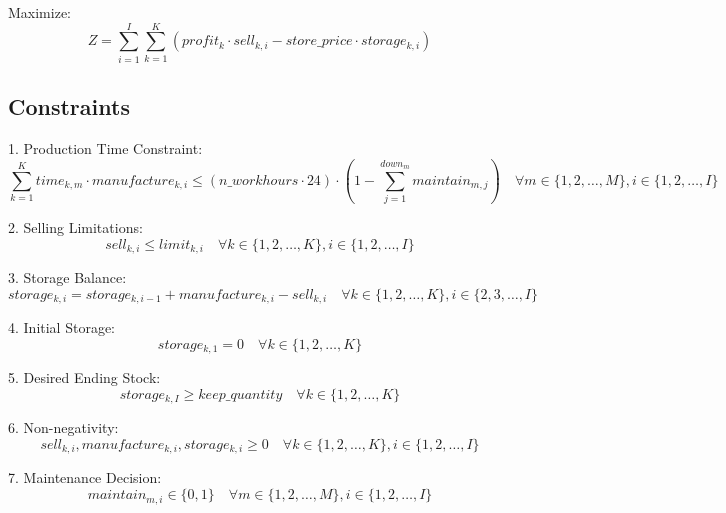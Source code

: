 \documentclass{article}
\begin{document}
Maximize:
\[
Z = \sum_{i=1}^{I} \sum_{k=1}^{K} \left( profit_k \cdot sell_{k,i} - store\_price \cdot storage_{k,i} \right)
\]

\subsection*{Constraints}

1. Production Time Constraint:
\[
\sum_{k=1}^{K} time_{k,m} \cdot manufacture_{k,i} \leq (n\_workhours \cdot 24) \cdot (1 - \sum_{j=1}^{down_m} maintain_{m,j}) \quad \forall m \in \{1, 2, \ldots, M\}, i \in \{1, 2, \ldots, I\}
\]

2. Selling Limitations:
\[
sell_{k,i} \leq limit_{k,i} \quad \forall k \in \{1, 2, \ldots, K\}, i \in \{1, 2, \ldots, I\}
\]

3. Storage Balance:
\[
storage_{k,i} = storage_{k,i-1} + manufacture_{k,i} - sell_{k,i} \quad \forall k \in \{1, 2, \ldots, K\}, i \in \{2, 3, \ldots, I\}
\]

4. Initial Storage:
\[
storage_{k,1} = 0 \quad \forall k \in \{1, 2, \ldots, K\}
\]

5. Desired Ending Stock:
\[
storage_{k,I} \geq keep\_quantity \quad \forall k \in \{1, 2, \ldots, K\}
\]

6. Non-negativity:
\[
sell_{k,i}, manufacture_{k,i}, storage_{k,i} \geq 0 \quad \forall k \in \{1, 2, \ldots, K\}, i \in \{1, 2, \ldots, I\}
\]

7. Maintenance Decision:
\[
maintain_{m,i} \in \{0, 1\} \quad \forall m \in \{1, 2, \ldots, M\}, i \in \{1, 2, \ldots, I\}
\]
\end{document}
